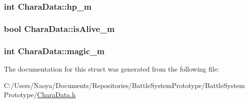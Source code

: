 \subsubsection[{hp\+\_\+m}]{\setlength{\rightskip}{0pt plus 5cm}int Chara\+Data\+::hp\+\_\+m}\label{struct_chara_data_a7186ee61c28b6a84b0c7a41524ee7d01}
\hypertarget{struct_chara_data_a87b4617204eaa6cb9a683389afb0647e}{}
\subsubsection[{is\+Alive\+\_\+m}]{\setlength{\rightskip}{0pt plus 5cm}bool Chara\+Data\+::is\+Alive\+\_\+m}\label{struct_chara_data_a87b4617204eaa6cb9a683389afb0647e}
\hypertarget{struct_chara_data_ad76e5c9e2a90755979af927101ec43ac}{}
\subsubsection[{magic\+\_\+m}]{\setlength{\rightskip}{0pt plus 5cm}int Chara\+Data\+::magic\+\_\+m}\label{struct_chara_data_ad76e5c9e2a90755979af927101ec43ac}


The documentation for this struct was generated from the following file\+:\begin{DoxyCompactItemize}
\item 
C\+:/\+Users/\+Naoya/\+Documents/\+Repositories/\+Battle\+System\+Prototype/\+Battle\+System\+Prototype/\hyperlink{_chara_data_8h}{Chara\+Data.\+h}\end{DoxyCompactItemize}
